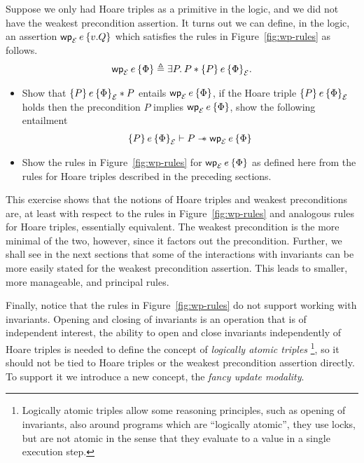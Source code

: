 \begin{exercise}
  Suppose we only had Hoare triples as a primitive in the logic, and we did not have the weakest precondition assertion.
  It turns out we can define, in the logic, an assertion $\wpre{e}[\El]{v.Q}$ which satisfies the rules in Figure~\ref{fig:wp-rules} as follows.
  \begin{align*}
    \wpre{e}[\El]{\Phi} \eqdef \Exists P . P \ast \hoare{P}{e}{\Phi}[\El].
  \end{align*}
  \begin{itemize}
  \item Show that $\hoare{P}{e}{\Phi}[\El] \ast P$ entails $\wpre{e}[\El]{\Phi}$, \ie{} if the Hoare triple $\hoare{P}{e}{\Phi}[\El]$ holds then the precondition $P$ implies $\wpre{e}[\El]{\Phi}$, \ie{} show the following entailment
    \begin{align*}
      \hoare{P}{e}{\Phi}[\El] \proves P \wand \wpre{e}[\El]{\Phi}
    \end{align*}
  \item Show the rules in Figure~\ref{fig:wp-rules} for $\wpre{e}[\El]{\Phi}$ as defined here from the rules for Hoare triples described in the preceding sections. \qedhere
  \end{itemize}
\end{exercise}

This exercise shows that the notions of Hoare triples and weakest
preconditions are, at least with respect to the rules in Figure~\ref{fig:wp-rules} and analogous rules for Hoare triples, essentially equivalent.
The weakest precondition is the more minimal of the two, however, since it factors out the precondition.
Further, we shall see in the next sections that some of the interactions with invariants can be more easily stated for the weakest precondition assertion.
This leads to smaller, more manageable, and principal rules.

Finally, notice that the rules in Figure~\ref{fig:wp-rules} do not support working with invariants.
Opening and closing of invariants is an operation that is of independent interest, \eg{} the ability to open and close invariants independently of Hoare triples is needed to define the concept of \emph{logically atomic triples}%
\footnote{Logically atomic triples allow some reasoning principles, such as opening of invariants, also around programs which are ``logically atomic'', \eg{} they use locks, but are not atomic in the sense that they evaluate to a value in a single execution step.}, so it should not be tied to Hoare triples or the weakest precondition assertion directly.
To support it we introduce a new concept, the \emph{fancy update modality}.

